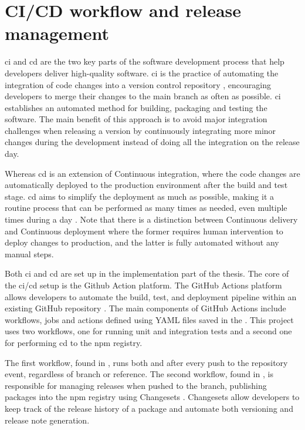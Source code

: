 \section{CI/CD workflow and release management}

\acrlong{ci} and \acrlong{cd} are the two key parts of the software development process that help developers deliver high-quality software. \acrfull{ci} is the practice of automating the integration of code changes into a version control repository \cite{atlassianContinuousIntegrationVs}, encouraging developers to merge their changes to the main branch as often as possible. \acrshort{ci} establishes an automated method for building, packaging and testing the software. The main benefit of this approach is to avoid major integration challenges when releasing a version by continuously integrating more minor changes during the development instead of doing all the integration on the release day.

Whereas \acrfull{cd} is an extension of Continuous integration, where the code changes are automatically deployed to the production environment after the build and test stage. \acrshort{cd} aims to simplify the deployment as much as possible, making it a routine process that can be performed as many times as needed, even multiple times during a day \cite{WhatCICD}. Note that there is a distinction between Continuous delivery and Continuous deployment where the former requires human intervention to deploy changes to production, and the latter is fully automated without any manual steps.

Both \acrlong{ci} and \acrlong{cd} are set up in the implementation part of the thesis. The core of the \acrshort{ci}/\acrshort{cd} setup is the Github Action platform. The GitHub Actions platform allows developers to automate the build, test, and deployment pipeline within an existing GitHub repository \cite{UnderstandingGitHubActions}. The main components of GitHub Actions include workflows, jobs and actions defined using YAML files saved in the . This project uses two workflows, one for running unit and integration tests and a second one for performing \acrfull{cd} to the \acrshort{npm} registry.

The first workflow, found in , runs both  and  after every push to the repository event, regardless of branch or reference. The second workflow, found in , is responsible for managing releases when pushed to the  branch, publishing packages into the \acrshort{npm} registry using Changesets \cite{ChangesetsChangesets2023}. Changesets allow developers to keep track of the release history of a package and automate both versioning and release note generation.

